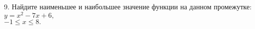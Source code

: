 9. Найдите наименьшее и наибольшее значение функции на данном промежутке: $y=x^2-7x+6,$ \\
$-1\le x\le 8.$\\
